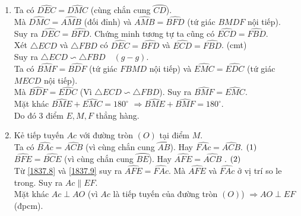 \begin{ex}
{\begin{enumerate}
Chứng minh tương tự ta cũng có $AB \cdot AF = AD \cdot AM.$ $\refstepcounter{equation}\hfill (\theequation)\label{1837.7}$\\
Từ  \eqref{1837.6} và  \eqref{1837.7} suy ra $AE \cdot AC = AB \cdot AF \Leftrightarrow \dfrac{AE}{AB} = \dfrac{AF}{AC}$.\\
Suy ra tứ giác $BECF$ nội tiếp đường tròn.
\item Ta có $\widehat{DEC} = \widehat{DMC}$ (cùng chắn cung $\wideparen{CD}$).\\
Mà $\widehat{DMC} =\widehat{AMB}$ (đối đỉnh) và $ \widehat{AMB}= \widehat{BFD}$ (tứ giác $BMDF$ nội tiếp).\\
Suy ra $\widehat{DEC} = \widehat{BFD}$.
Chứng minh tương tự ta cũng có $\widehat{ECD} = \widehat{FBD}$.\\
Xét $\triangle ECD$ và $\triangle FBD$ có 
$\widehat{DEC} = \widehat{BFD}$ và $\widehat{ECD} = \widehat{FBD}$. (cmt)\\
Suy ra $\triangle ECD \backsim \triangle FBD \quad (g-g)$.\\
Ta có $\widehat{BMF} = \widehat{BDF}$ (tứ giác $FBMD$ nội tiếp)
và $\widehat{EMC} = \widehat{EDC}$ (tứ giác $MECD$ nội tiếp).\\
Mà $\widehat{BDF} = \widehat{EDC}$ (Vì $\triangle ECD \backsim \triangle FBD$).
Suy ra $\widehat{BMF} = \widehat{EMC}$.\\
Mặt khác $\widehat{BME}+ \widehat{EMC} = 180^\circ$
$\Rightarrow \widehat{BME}+ \widehat{BMF} = 180^\circ$.\\
Do đó $3$ điểm $E, M, F$ thẳng hàng.
\item Kẻ tiếp tuyến $Ac$ với đường tròn $(O)$ tại điểm $M$.\\
Ta có $\widehat{BAc} = \widehat{ACB}$ (vì cùng chắn cung $\wideparen{AB}$).
Hay $\widehat{FAc} = \widehat{ACB}$. $\refstepcounter{equation}\hfill (\theequation)\label{1837.8}$\\
$\widehat{BFE}= \widehat{BCE}$ (vì cùng chắn cung $\wideparen{BE}$). Hay $\widehat{AFE} = \widehat{ACB}$ . $\refstepcounter{equation}\hfill (\theequation)\label{1837.9}$\\
Từ  \eqref{1837.8} và  \eqref{1837.9} suy ra $\widehat{AFE} = \widehat{FAc}$.
Mà $\widehat{AFE}$ và $ \widehat{FAc}$ ở vị trí so le trong.
Suy ra $Ac \parallel EF$.\\
Mặt khác $Ac \perp AO$ (vì $Ac$ là tiếp tuyến của đường tròn $(O)$)
$\Rightarrow AO \perp EF $ (đpcm).
\end{enumerate}	
}
\end{ex}
